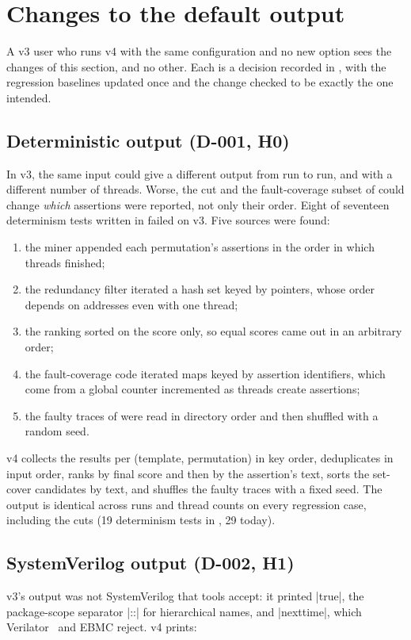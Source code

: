 \section{Changes to the default output}\label{sec:default}
A v3 user who runs v4 with the same configuration and no new option sees the changes of this section, and no other. Each is a decision recorded in , with the regression baselines updated once and the change checked to be exactly the one intended.

\subsection{Deterministic output (D-001, H0)}
In v3, the same input could give a different output from run to run, and with a different number of threads. Worse, the  cut and the fault-coverage subset of  could change \emph{which} assertions were reported, not only their order. Eight of seventeen determinism tests written in  failed on v3. Five sources were found:
\begin{enumerate}
\item the miner appended each permutation's assertions in the order in which threads finished;
\item the redundancy filter iterated a hash set keyed by pointers, whose order depends on addresses even with one thread;
\item the ranking sorted on the score only, so equal scores came out in an arbitrary order;
\item the fault-coverage code iterated maps keyed by assertion identifiers, which come from a global counter incremented as threads create assertions;
\item the faulty traces of  were read in directory order and then shuffled with a random seed.
\end{enumerate}
v4 collects the results per (template, permutation) in key order, deduplicates in input order, ranks by final score and then by the assertion's text, sorts the set-cover candidates by text, and shuffles the faulty traces with a fixed seed. The output is identical across runs and thread counts on every regression case, including the  cuts (19 determinism tests in , 29 today).

\subsection{SystemVerilog output (D-002, H1)}
v3's  output was not SystemVerilog that tools accept: it printed \code|true|, the package-scope separator \code|::| for hierarchical names, and \code|nexttime|, which Verilator~\cite{verilator} and EBMC reject. v4 prints:

